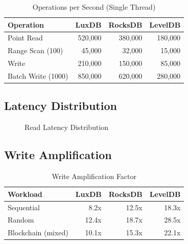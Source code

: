 \documentclass[11pt,a4paper]{article}
\begin{document}
\begin{table}[htbp]
\centering
\caption{Operations per Second (Single Thread)}
\begin{tabular}{lrrr}
\toprule
\textbf{Operation} & \textbf{LuxDB} & \textbf{RocksDB} & \textbf{LevelDB} \\
\midrule
Point Read & 520,000 & 380,000 & 180,000 \\
Range Scan (100) & 45,000 & 32,000 & 15,000 \\
Write & 210,000 & 150,000 & 85,000 \\
Batch Write (1000) & 850,000 & 620,000 & 280,000 \\
\bottomrule
\end{tabular}
\label{tab:throughput}
\end{table}

\subsection{Latency Distribution}

\begin{figure}[htbp]
\centering
{}
\caption{Read Latency Distribution}
\label{fig:latency}
\end{figure}

\subsection{Write Amplification}

\begin{table}[htbp]
\centering
\caption{Write Amplification Factor}
\begin{tabular}{lrrr}
\toprule
\textbf{Workload} & \textbf{LuxDB} & \textbf{RocksDB} & \textbf{LevelDB} \\
\midrule
Sequential & 8.2x & 12.5x & 18.3x \\
Random & 12.4x & 18.7x & 28.5x \\
Blockchain (mixed) & 10.1x & 15.3x & 22.1x \\
\bottomrule
\end{tabular}
\label{tab:wa}
\end{table}
\end{document}
